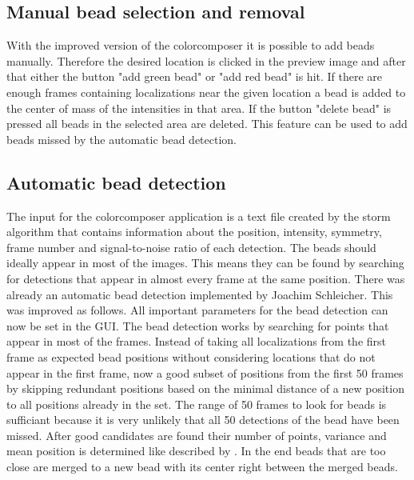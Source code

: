 \subsection{Manual bead selection and removal}
With the improved version of the colorcomposer it is possible to add beads manually. Therefore the desired location is clicked in the preview image and after that either the button "add green bead" or "add red bead" is hit. If there are enough frames containing localizations near the given location a bead is added to the center of mass of the intensities in that area. If the button "delete bead" is pressed all beads in the selected area are deleted.\newline
This feature can be used to add beads missed by the automatic bead detection.
\subsection{Automatic bead detection}
The input for the colorcomposer application is a text file created by the storm
algorithm that contains information about the position, intensity, symmetry,
frame number and signal-to-noise ratio of each detection. The beads should
ideally appear in most of the images. This means they can be found by searching for
detections that appear in almost every frame at the same position.\newline
There was already an automatic bead detection implemented by Joachim Schleicher. This was improved as follows.\newline
All important parameters for the bead detection can now be set in the GUI. The bead detection works by searching for points that appear in most of the frames. Instead of taking all localizations from the first frame as expected bead positions without considering locations that do not appear in the first frame, now a good subset of positions from the first 50 frames by skipping redundant positions based on the minimal distance of a new position to all positions already in the set. The range of 50 frames to look for beads is sufficiant because it is very unlikely that all 50 detections of the bead have been missed.\newline
After good candidates are found their number of points, variance and mean position is determined like described by \cite{MAJoachim}.\newline
In the end beads that are too close are merged to a new bead with its center right between the merged beads.


